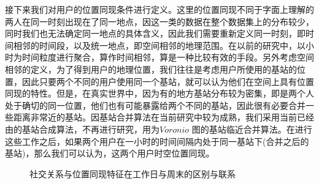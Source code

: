 接下来我们对用户的位置同现条件进行定义。这里的位置同现不同于字面上理解的两人在同一时刻出现在了同一地点，因这一类的数据在整个数据集上的分布较少，同时我们也无法确定同一地点的具体含义，因此我们需要重新定义同一时刻，即时间相邻的时间段，以及统一地点，即空间相邻的地理范围。在以前的研究中，以小时为时间粒度进行聚合，算作时间相邻，算是一种比较有效的手段。另外考虑空间相邻的定义，为了得到用户的地理位置，我们往往是考虑用户所使用的基站的位置，因此只要两个不同的用户使用同一个基站，就可以认为他们在空间上具有位置同现的特性。但是，在真实世界中，因为有的地方基站分布较为密集，即是两个人处于确切的同一位置，他们也有可能暴露给两个不同的基站，因此很有必要合并一些距离非常近的基站。因基站合并算法在当前研究中较为成熟，我们采用当前已经由的基站合成算法，不再进行研究，用为$Voronio$ 图的基站临近合并算法。在进行这些工作之后，如果两个用户在一小时的时间间隔内处于同一基站下(合并之后的基站)，那么我们可以认为，这两个用户时空位置同现。



\begin{figure}[!ht]
    \centering
    \hspace{7em} %
    \caption{社交关系与位置同现特征在工作日与周末的区别与联系}
    \label{fig-spatialhomo}
\end{figure}

